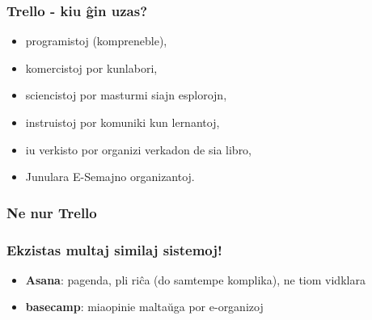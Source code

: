   \begin{frame}
    \frametitle{Trello - kiu ĝin uzas?}
    
    \begin{itemize}
    	\item programistoj (kompreneble),
    	\item komercistoj por kunlabori,
    	\item sciencistoj por masturmi siajn esplorojn,
    	\item instruistoj por komuniki kun lernantoj,
    	\item iu verkisto por organizi verkadon de sia libro,
    	\item Junulara E-Semajno organizantoj.
    \end{itemize}
    
  \end{frame}
  

  \begin{frame}
    \frametitle{Ne nur Trello}
    \frametitle{Ekzistas multaj similaj sistemoj!}
    
    	\begin{itemize}
    		\item \textbf{Asana}: pagenda, pli riĉa (do samtempe komplika), ne tiom vidklara
    		\item \textbf{basecamp}: miaopinie maltaŭga por e-organizoj
    	\end{itemize}
  \end{frame}

